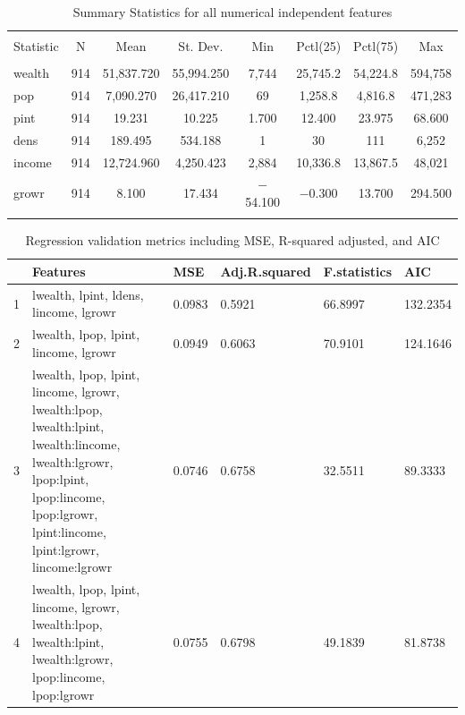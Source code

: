 \documentclass[11pt]{article}\usepackage[]{graphicx}\usepackage[]{color}
\begin{document}
\begin{center}

\begin{table}[H] \centering 
  \caption{Summary Statistics for all numerical independent features} 
  \label{descrips} 
\begin{tabular}{@{\extracolsep{5pt}}lccccccc} 
\\[-1.8ex]\hline 
\hline \\[-1.8ex] 
Statistic & \multicolumn{1}{c}{N} & \multicolumn{1}{c}{Mean} & \multicolumn{1}{c}{St. Dev.} & \multicolumn{1}{c}{Min} & \multicolumn{1}{c}{Pctl(25)} & \multicolumn{1}{c}{Pctl(75)} & \multicolumn{1}{c}{Max} \\ 
\hline \\[-1.8ex] 
wealth & 914 & 51,837.720 & 55,994.250 & 7,744 & 25,745.2 & 54,224.8 & 594,758 \\ 
pop & 914 & 7,090.270 & 26,417.210 & 69 & 1,258.8 & 4,816.8 & 471,283 \\ 
pint & 914 & 19.231 & 10.225 & 1.700 & 12.400 & 23.975 & 68.600 \\ 
dens & 914 & 189.495 & 534.188 & 1 & 30 & 111 & 6,252 \\ 
income & 914 & 12,724.960 & 4,250.423 & 2,884 & 10,336.8 & 13,867.5 & 48,021 \\ 
growr & 914 & 8.100 & 17.434 & $-$54.100 & $-$0.300 & 13.700 & 294.500 \\ 
\hline \\[-1.8ex] 
\end{tabular} 
\end{table} 

\end{center} 

\begin{center}
\begin{table}[ht]
\centering
\begin{tabular}{rp{2in}llll}
  \hline
 & Features & MSE & Adj.R.squared & F.statistics & AIC \\ 
  \hline
1 & lwealth, lpint, ldens, lincome, lgrowr & 0.0983 & 0.5921 & 66.8997 & 132.2354 \\ 
  2 & lwealth, lpop, lpint, lincome, lgrowr & 0.0949 & 0.6063 & 70.9101 & 124.1646 \\ 
  3 & lwealth, lpop, lpint, lincome, lgrowr, lwealth:lpop, lwealth:lpint, lwealth:lincome, lwealth:lgrowr, lpop:lpint, lpop:lincome, lpop:lgrowr, lpint:lincome, lpint:lgrowr, lincome:lgrowr & 0.0746 & 0.6758 & 32.5511 & 89.3333 \\ 
  4 & lwealth, lpop, lpint, lincome, lgrowr, lwealth:lpop, lwealth:lpint, lwealth:lgrowr, lpop:lincome, lpop:lgrowr & 0.0755 & 0.6798 & 49.1839 & 81.8738 \\ 
   \hline
\end{tabular}
\caption{Regression validation metrics including MSE, R-squared adjusted, and AIC} 
\label{reg_vali_metric}
\end{table}

\end{center}
\end{document}
